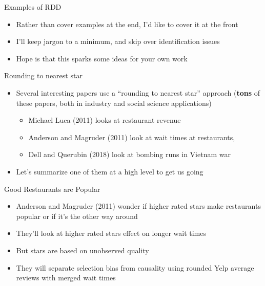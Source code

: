 \documentclass{beamer}
\begin{document}
\begin{frame}{Examples of RDD}

\begin{itemize}
\item Rather than cover examples at the end, I'd like to cover it at the front
\item I'll keep jargon to a minimum, and skip over identification issues
\item Hope is that this sparks some ideas for your own work
\end{itemize}

\end{frame}


\begin{frame}{Rounding to nearest star}

\begin{itemize}
\item Several interesting papers use a ``rounding to nearest star'' approach (\textbf{tons} of these papers, both in industry and social science applications)
	\begin{itemize}
	\item Michael Luca (2011) looks at restaurant revenue
	\item Anderson and Magruder (2011) look at wait times at restaurants, 
	\item Dell and Querubin (2018) look at bombing runs in Vietnam war
	\end{itemize}
\item Let's summarize one of them at a high level to get us going
\end{itemize}

\end{frame}




\begin{frame}{Good Restaurants are Popular}

\begin{itemize}
\item Anderson and Magruder (2011) wonder if higher rated stars make restaurants popular or if it's the other way around
\item They'll look at higher rated stars effect on longer wait times
\item But stars are based on unobserved quality
\item They will separate selection bias from causality using rounded Yelp average reviews with merged wait times
\end{itemize}

\end{frame}
\end{document}
